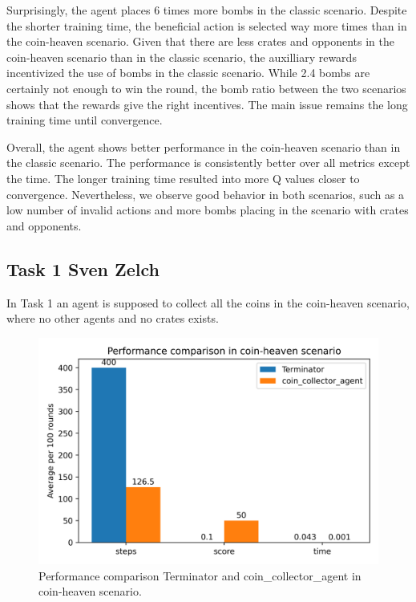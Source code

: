 \documentclass[
	letterpaper, %
	12pt, %
]{CSUniSchoolLabReport}
\begin{document}
Surprisingly, the agent places 6 times more bombs in the classic scenario. Despite the shorter training time,
the beneficial action is selected way more times than in the coin-heaven scenario. Given that there are less
crates and opponents in the coin-heaven scenario than in the classic scenario, the auxilliary rewards incentivized
the use of bombs in the classic scenario. While 2.4 bombs are certainly not enough to win the round,
the bomb ratio between the two scenarios shows that the rewards give the right incentives. The main issue remains
the long training time until convergence.


Overall, the agent shows better performance in the coin-heaven scenario than in
the classic scenario. The performance is consistently better over all metrics except the time.
The longer training time resulted into more Q values closer to convergence. Nevertheless,
we observe good behavior in both scenarios, such as a low number of invalid actions and more bombs placing in
the scenario with crates and opponents.


\subsection{Task 1 \tiny Sven Zelch}

In Task 1 an agent is supposed to collect all the coins in the coin-heaven scenario, where no other agents and no crates exists.


\begin{figure}[h]
	\centering
	\includegraphics[scale=0.6]{Figures/Task1.png}
	\caption{Performance comparison Terminator and coin\_collector\_agent in coin-heaven scenario.}
	\label{img:Task1}
\end{figure}
\end{document}
